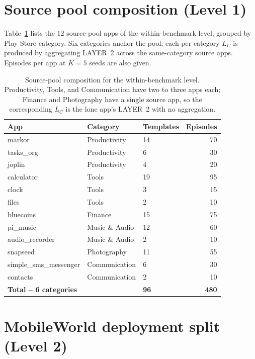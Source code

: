 \section{Source pool composition (Level 1)}
\label{app:source-pool}

Table~\ref{tab:source-apps} lists the 12 source-pool apps of the within-benchmark
level, grouped by Play Store category. Six categories anchor the pool; each
per-category $L_C$ is produced by aggregating LAYER~2 across the same-category
source apps. Episodes per app at $K{=}5$ seeds are also given.

\begin{table}[t]
\small
\centering
\begin{tabular}{lll r}
\hline
\textbf{App} & \textbf{Category} & \textbf{Templates} & \textbf{Episodes} \\
\hline
markor               & Productivity     & 14 & 70 \\
tasks\_org           & Productivity     &  6 & 30 \\
joplin               & Productivity     &  4 & 20 \\
calculator           & Tools            & 19 & 95 \\
clock                & Tools            &  3 & 15 \\
files                & Tools            &  2 & 10 \\
bluecoins            & Finance          & 15 & 75 \\
pi\_music            & Music \& Audio   & 12 & 60 \\
audio\_recorder      & Music \& Audio   &  2 & 10 \\
snapseed             & Photography      & 11 & 55 \\
simple\_sms\_messenger & Communication  &  6 & 30 \\
contacts             & Communication    &  2 & 10 \\
\hline
\textbf{Total -- 6 categories} & & \textbf{96} & \textbf{480} \\
\hline
\end{tabular}
\caption{Source-pool composition for the within-benchmark level. Productivity,
Tools, and Communication have two to three apps each; Finance and Photography
have a single source app, so the corresponding $L_C$ is the lone app's LAYER~2
with no aggregation.}
\label{tab:source-apps}
\end{table}

\section{MobileWorld deployment split (Level 2)}
\label{app:mw-split}

